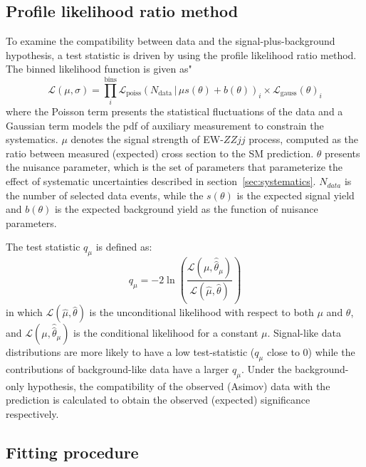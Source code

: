 \subsection{Profile likelihood ratio method}

To examine the compatibility between data and the signal-plus-background hypothesis, 
a test statistic is driven by using the profile likelihood ratio method.
The binned likelihood function is given as"
\begin{equation}
	\mathcal{L}(\mu,\sigma) = \prod_{i}^\mathrm{bins} \mathcal{L}_{\mathrm{poiss}}(N_{\mathrm{data}}\,|\,\mu s(\theta)+b(\theta))_{i} \times \mathcal{L}_{\text{gauss}}(\theta)_{i}
\end{equation}
where the Poisson term presents the statistical fluctuations of the data 
and a Gaussian term models the pdf of auxiliary measurement to constrain the systematics.
$\mu$ denotes the signal strength of EW-$ZZjj$ process, computed as the ratio between measured (expected) cross section to the SM prediction.
$\theta$ presents the nuisance parameter, which is the set of parameters that parameterize the effect of systematic uncertainties described in section~\ref{sec:systematics}.
$N_{data}$ is the number of selected data events, while the $s(\theta)$ is the expected signal yield and $b(\theta)$ is the expected background yield as the function of nuisance parameters.

The test statistic $q_{\mu}$ is defined as:
\begin{equation}
	q_\mu = -2 \ln \left( \dfrac{\mathcal{L}(\mu,\hat{\hat{\theta}}_{\mu})}{\mathcal{L}(\hat{\mu},\hat{\theta})} \right)
\end{equation}
in which $\mathcal{L}(\hat{\mu},\hat{\theta})$ is the unconditional likelihood with respect to both $\mu$ and $\theta$,
and $\mathcal{L}(\mu,\hat{\hat{\theta}}_{\mu})$ is the conditional likelihood for a constant $\mu$.
Signal-like data distributions are more likely to have a low test-statistic ($q_\mu$ close to 0) 
while the contributions of background-like data have a larger $q_\mu$.
Under the background-only hypothesis, the compatibility of the observed (Asimov) data with the prediction 
is calculated to obtain the observed (expected) significance respectively.

\subsection{Fitting procedure}

